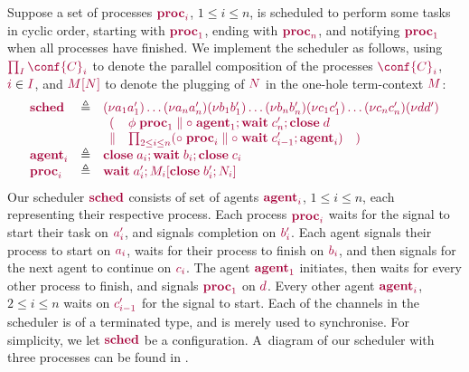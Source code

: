 \documentclass[main.tex]{subfiles}
\begin{document}
\begin{example}\label{sec:pgv-example}
Suppose a set of processes $\tm{\proc{i}}$, $1\leq{i}\leq{n}$, is scheduled to perform some tasks in cyclic order, starting with $\tm{\proc1}$, ending with $\tm{\proc{n}}$, and notifying $\tm{\proc1}$ when all processes have finished.
We implement the scheduler as follows, using $\tm{\prod_{I}\conf{C}_i}$ to denote the parallel composition of the processes $\tm{\conf{C}_i}$, $\tm{i}\in\tm{I}$, and $\tm{\plug{M}{N}}$ to denote the plugging of $\tm{N}$ in the one-hole term-context $\tm{M}$:
\[
  \begin{array}{lrlr}
    \tm{\sched}
    & \defeq & \tm{\res{a_1}{a'_1}{\dots{\res{a_n}{a'_n}{}}}}
               \tm{\res{b_1}{b'_1}{\dots{\res{b_n}{b'_n}{}}}}
               \tm{\res{c_1}{c'_1}{\dots{\res{c_n}{c'_n}{}}}}
               \tm{\res{d}{d'}{}}
    \\ &     & \tm{\begin{array}{lll}
                     (
                     & \phi\;\proc1
                     \parallel
                     \child\;\andthen{\agent1}{\andthen{\wait\;{c'_n}}{\close\;{d}}}
                     \\
                     \parallel
                     &
                     \prod_{2\leq{i}\leq{n}}
                     (\child\;\proc{i} \parallel \child\;\andthen{\wait\;{c'_{i-1}}}{\agent{i}})
                     & )
                   \end{array}}
    \\
    \tm{\agent{i}}
    & \defeq & \tm{\andthen{\close\;{a_i}}{\andthen{\wait\;{b_i}}{\close\;{c_i}}}}
    \\
    \tm{\proc{i}}
    & \defeq & \tm{\andthen{\wait\;{a'_i}}{\plug{M_i}{\andthen{\close\;{b'_i}}{N_i}}}}
  \end{array}
\]
Our scheduler $\tm{\sched}$ consists of set of agents $\tm{\agent{i}}$, $1\leq{i}\leq{n}$, each representing their respective process. Each process $\tm{\proc{i}}$ waits for the signal to start their task on $\tm{a'_i}$, and signals completion on $\tm{b'_i}$. Each agent signals their process to start on $\tm{a_i}$, waits for their process to finish on $\tm{b_i}$, and then signals for the next agent to continue on $\tm{c_i}$. The agent $\tm{\agent1}$ initiates, then waits for every other process to finish, and signals $\tm{\proc1}$ on $\tm{d}$. Every other agent $\tm{\agent{i}}$, $2\leq{i}\leq{n}$ waits on $\tm{c'_{i-1}}$ for the signal to start.
Each of the channels in the scheduler is of a terminated type, and is merely used to synchronise. For simplicity, we let $\tm{\sched}$ be a configuration.
A~diagram of our scheduler with three processes can be found in .
\end{example}
\end{document}
